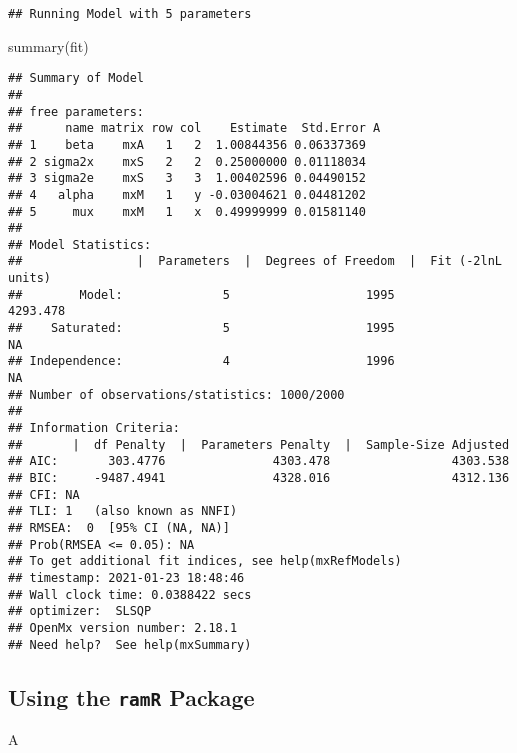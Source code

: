 \documentclass[
]{book}
\newenvironment{Shaded}{\begin{snugshade}}{\end{snugshade}}
\newcommand{\FunctionTok}[1]{\textcolor[rgb]{0.00,0.00,0.00}{#1}}
\newcommand{\NormalTok}[1]{#1}
\theoremstyle{definition}
\theoremstyle{definition}
\theoremstyle{definition}
\theoremstyle{remark}
\begin{document}
\begin{verbatim}
## Running Model with 5 parameters
\end{verbatim}

\begin{Shaded}
\begin{Highlighting}[]
\FunctionTok{summary}\NormalTok{(fit)}
\end{Highlighting}
\end{Shaded}

\begin{verbatim}
## Summary of Model 
##  
## free parameters:
##      name matrix row col    Estimate  Std.Error A
## 1    beta    mxA   1   2  1.00844356 0.06337369  
## 2 sigma2x    mxS   2   2  0.25000000 0.01118034  
## 3 sigma2e    mxS   3   3  1.00402596 0.04490152  
## 4   alpha    mxM   1   y -0.03004621 0.04481202  
## 5     mux    mxM   1   x  0.49999999 0.01581140  
## 
## Model Statistics: 
##                |  Parameters  |  Degrees of Freedom  |  Fit (-2lnL units)
##        Model:              5                   1995              4293.478
##    Saturated:              5                   1995                    NA
## Independence:              4                   1996                    NA
## Number of observations/statistics: 1000/2000
## 
## Information Criteria: 
##       |  df Penalty  |  Parameters Penalty  |  Sample-Size Adjusted
## AIC:       303.4776               4303.478                 4303.538
## BIC:     -9487.4941               4328.016                 4312.136
## CFI: NA 
## TLI: 1   (also known as NNFI) 
## RMSEA:  0  [95% CI (NA, NA)]
## Prob(RMSEA <= 0.05): NA
## To get additional fit indices, see help(mxRefModels)
## timestamp: 2021-01-23 18:48:46 
## Wall clock time: 0.0388422 secs 
## optimizer:  SLSQP 
## OpenMx version number: 2.18.1 
## Need help?  See help(mxSummary)
\end{verbatim}

\hypertarget{using-the-ramr-package-1}{%
\subsection{\texorpdfstring{Using the \texttt{ramR} Package}{Using the ramR Package}}\label{using-the-ramr-package-1}}

\begin{Shaded}
\begin{Highlighting}[]
\NormalTok{A}
\end{Highlighting}
\end{Shaded}
\end{document}
